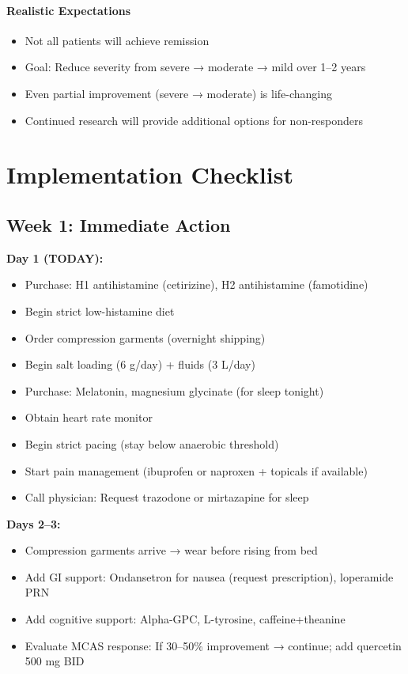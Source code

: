 \paragraph{Realistic Expectations}
\begin{itemize}
    \item Not all patients will achieve remission
    \item Goal: Reduce severity from severe → moderate → mild over 1--2 years
    \item Even partial improvement (severe → moderate) is life-changing
    \item Continued research will provide additional options for non-responders
\end{itemize}

\section{Implementation Checklist}
\label{sec:implementation-checklist}

\subsection{Week 1: Immediate Action}

\textbf{Day 1 (TODAY):}
\begin{itemize}
    \item[$\square$] Purchase: H1 antihistamine (cetirizine), H2 antihistamine (famotidine)
    \item[$\square$] Begin strict low-histamine diet
    \item[$\square$] Order compression garments (overnight shipping)
    \item[$\square$] Begin salt loading (6 g/day) + fluids (3 L/day)
    \item[$\square$] Purchase: Melatonin, magnesium glycinate (for sleep tonight)
    \item[$\square$] Obtain heart rate monitor
    \item[$\square$] Begin strict pacing (stay below anaerobic threshold)
    \item[$\square$] Start pain management (ibuprofen or naproxen + topicals if available)
    \item[$\square$] Call physician: Request trazodone or mirtazapine for sleep
\end{itemize}

\textbf{Days 2--3:}
\begin{itemize}
    \item[$\square$] Compression garments arrive → wear before rising from bed
    \item[$\square$] Add GI support: Ondansetron for nausea (request prescription), loperamide PRN
    \item[$\square$] Add cognitive support: Alpha-GPC, L-tyrosine, caffeine+theanine
    \item[$\square$] Evaluate MCAS response: If 30--50\% improvement → continue; add quercetin 500 mg BID
\end{itemize}

